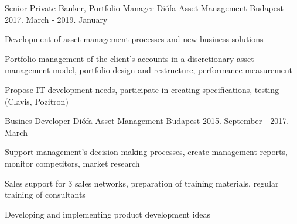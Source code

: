 \begin{cventries}
  \cventry
    {Senior Private Banker, Portfolio Manager} %
    {Diófa Asset Management} %
    {Budapest} %
    {2017. March - 2019. January} %
    {
      \begin{cvitems} %
        \item {Development of asset management processes and new business solutions}
        \item {Portfolio management of the client's accounts in a discretionary asset management model, portfolio design and restructure, performance measurement}
        \item {Propose IT development needs, participate in creating specifications, testing (Clavis, Pozitron)}
      \end{cvitems}
    }

  \cventry
    {Busines Developer} %
    {Diófa Asset Management} %
    {Budapest} %
    {2015. September - 2017. March} %
    {
      \begin{cvitems} %
        \item {Support management's decision-making processes, create management reports, monitor competitors, market research}
        \item {Sales support for 3 sales networks, preparation of training materials, regular training of consultants}
        \item {Developing and implementing product development ideas}
      \end{cvitems}
    }

\end{cventries}
